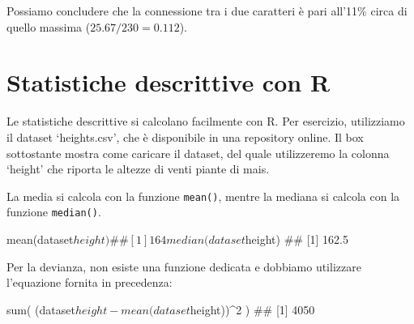 \documentclass[a4paper,12pt,oneside]{book}
\newenvironment{Shaded}{\begin{snugshade}}{\end{snugshade}}
\newcommand{\DecValTok}[1]{#1}
\newcommand{\SpecialCharTok}[1]{#1}
\newcommand{\StringTok}[1]{#1}
\newcommand{\DocumentationTok}[1]{#1}
\newcommand{\OtherTok}[1]{#1}
\newcommand{\FunctionTok}[1]{#1}
\newcommand{\AttributeTok}[1]{#1}
\newcommand{\NormalTok}[1]{#1}
\begin{document}
Possiamo concludere che la connessione tra i due caratteri è pari all'11\% circa di quello massima (\(25.67/230 = 0.112\)).

\hypertarget{statistiche-descrittive-con-r}{%
\section{Statistiche descrittive con R}\label{statistiche-descrittive-con-r}}

Le statistiche descrittive si calcolano facilmente con R. Per esercizio, utilizziamo il dataset `heights.csv', che è disponibile in una repository online. Il box sottostante mostra come caricare il dataset, del quale utilizzeremo la colonna `height' che riporta le altezze di venti piante di mais.

\begin{Shaded}
\end{Shaded}

La media si calcola con la funzione \texttt{mean()}, mentre la mediana si calcola con la funzione \texttt{median()}.

\begin{Shaded}
\begin{Highlighting}[]
\FunctionTok{mean}\NormalTok{(dataset}\SpecialCharTok{$}\NormalTok{height)}
\DocumentationTok{\#\# [1] 164}
\FunctionTok{median}\NormalTok{(dataset}\SpecialCharTok{$}\NormalTok{height)}
\DocumentationTok{\#\# [1] 162.5}
\end{Highlighting}
\end{Shaded}

Per la devianza, non esiste una funzione dedicata e dobbiamo utilizzare l'equazione fornita in precedenza:

\begin{Shaded}
\begin{Highlighting}[]
\FunctionTok{sum}\NormalTok{( (dataset}\SpecialCharTok{$}\NormalTok{height }\SpecialCharTok{{-}} \FunctionTok{mean}\NormalTok{(dataset}\SpecialCharTok{$}\NormalTok{height))}\SpecialCharTok{\^{}}\DecValTok{2}\NormalTok{ )}
\DocumentationTok{\#\# [1] 4050}
\end{Highlighting}
\end{Shaded}
\end{document}
